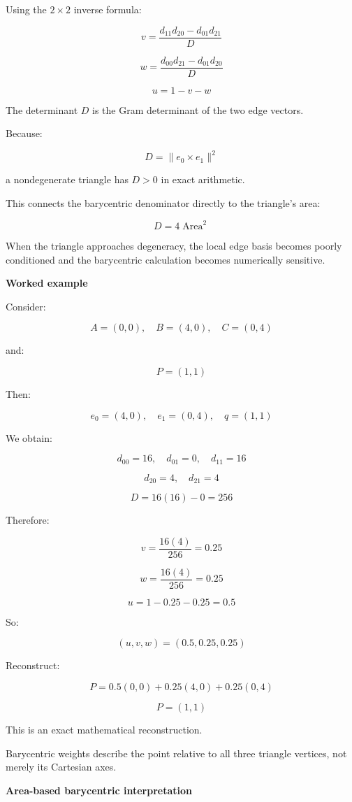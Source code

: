 Using the \(2\times2\) inverse formula:

\[
\boxed{ v=\frac{d_{11}d_{20}-d_{01}d_{21}}{D} }
\]

\[
\boxed{ w=\frac{d_{00}d_{21}-d_{01}d_{20}}{D} }
\]

\[
\boxed{u=1-v-w}
\]

The determinant \(D\) is the Gram determinant of the two edge vectors.

Because:

\[
D=\|e_0\times e_1\|^2
\]

a nondegenerate triangle has \(D>0\) in exact arithmetic.

This connects the barycentric denominator directly to the triangle's area:

\[
D=4\operatorname{Area}^2
\]

When the triangle approaches degeneracy, the local edge basis becomes poorly conditioned and the barycentric calculation becomes numerically sensitive.

\textbf{Worked example}

Consider:

\[
A=(0,0),\quad B=(4,0),\quad C=(0,4)
\]

and:

\[
P=(1,1)
\]

Then:

\[
e_0=(4,0),\quad e_1=(0,4),\quad q=(1,1)
\]

We obtain:

\[
d_{00}=16,\quad d_{01}=0,\quad d_{11}=16
\]

\[
d_{20}=4,\quad d_{21}=4
\]

\[
D=16(16)-0=256
\]

Therefore:

\[
v=\frac{16(4)}{256}=0.25
\]

\[
w=\frac{16(4)}{256}=0.25
\]

\[
u=1-0.25-0.25=0.5
\]

So:

\[
\boxed{(u,v,w)=(0.5,0.25,0.25)}
\]

Reconstruct:

\[
P=0.5(0,0)+0.25(4,0)+0.25(0,4)
\]

\[
P=(1,1)
\]

This is an exact mathematical reconstruction.

Barycentric weights describe the point relative to all three triangle vertices, not merely its Cartesian axes.

\textbf{Area-based barycentric interpretation}

